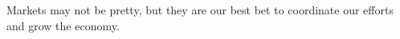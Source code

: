 Markets may not be pretty, but they are our best bet to coordinate our efforts and grow the economy.
